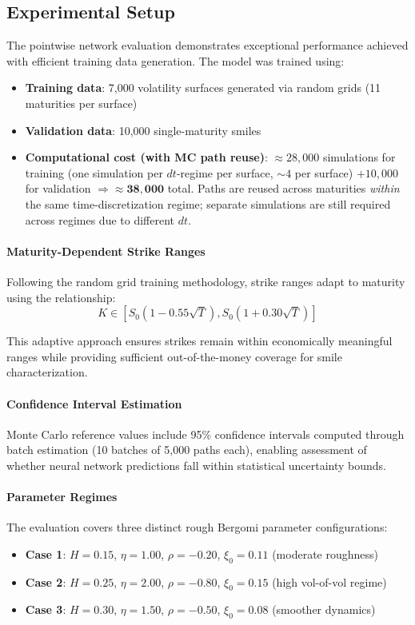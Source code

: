 	\subsection{Experimental Setup}
	
	The pointwise network evaluation demonstrates exceptional performance achieved with efficient training data generation. The model was trained using:
	
	\begin{itemize}[nosep]
		\item \textbf{Training data}: 7{,}000 volatility surfaces generated via random grids (11 maturities per surface)
		\item \textbf{Validation data}: 10{,}000 single-maturity smiles
		\item \textbf{Computational cost (with MC path reuse)}: 
		$\approx 28{,}000$ simulations for training 
		(one simulation per $dt$-regime per surface, $\sim 4$ per surface) 
		$+ 10{,}000$ for validation $\Rightarrow \mathbf{\approx 38{,}000}$ total. 
		Paths are reused across maturities \emph{within} the same time-discretization regime; 
		separate simulations are still required across regimes due to different $dt$.
	\end{itemize}
	
	
	\paragraph{Maturity-Dependent Strike Ranges}
	Following the random grid training methodology, strike ranges adapt to maturity using the relationship:
	\begin{equation}
		K \in [S_0(1 - 0.55\sqrt{T}), S_0(1 + 0.30\sqrt{T})]
	\end{equation}
	
	This adaptive approach ensures strikes remain within economically meaningful ranges while providing sufficient out-of-the-money coverage for smile characterization.
	
	\paragraph{Confidence Interval Estimation}
	Monte Carlo reference values include 95\% confidence intervals computed through batch estimation (10 batches of 5,000 paths each), enabling assessment of whether neural network predictions fall within statistical uncertainty bounds.
	
	\paragraph{Parameter Regimes}
	The evaluation covers three distinct rough Bergomi parameter configurations:
	\begin{itemize}[nosep]
		\item \textbf{Case 1}: $H = 0.15$, $\eta = 1.00$, $\rho = -0.20$, $\xi_0 = 0.11$ (moderate roughness)
		\item \textbf{Case 2}: $H = 0.25$, $\eta = 2.00$, $\rho = -0.80$, $\xi_0 = 0.15$ (high vol-of-vol regime)
		\item \textbf{Case 3}: $H = 0.30$, $\eta = 1.50$, $\rho = -0.50$, $\xi_0 = 0.08$ (smoother dynamics)
	\end{itemize}
	
